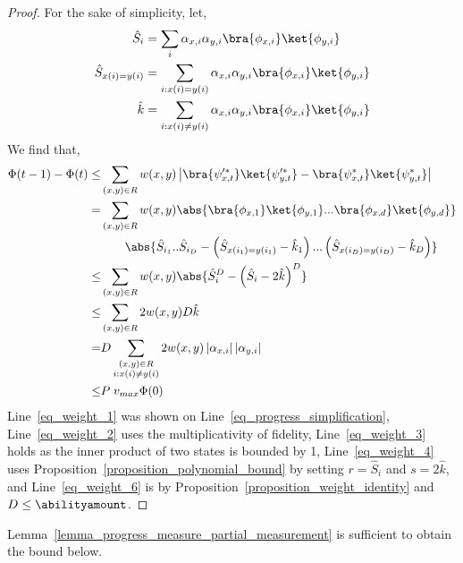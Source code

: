 \begin{proof}
    For the sake of simplicity, let,
    \begin{align*}
        \hat{S}_i &= \sum_{i} \alpha_{x,i}\alpha_{y,i}\bra{\phi_{x,i}}\ket{\phi_{y,i}}\\
        \hat{S}_{x(i)=y(i)} &= \sum_{i:x(i)=y(i) } \alpha_{x,i}\alpha_{y,i}\bra{\phi_{x,i}}\ket{\phi_{y,i}}\\
        \hat{k} &= \sum_{i: x(i)\neq y(i)}\alpha_{x,i}\alpha_{y,i}\bra{\phi_{x,i}}\ket{\phi_{y,i}}
    \end{align*}
    We find that,
    \begin{align}
        \Phi(t-1) - \Phi(t) \leq 
        &\sum_{(x,y)\in R} w(x,y) \left| \bra{\psi_{x,t}^{\prime *}}\ket{\psi_{y,t}^{\prime *}} - \bra{\psi_{x,t}^*}\ket{\psi_{y,t}^*} \right|\label{eq_weight_1}\\
        = &\sum_{(x,y)\in R} w(x,y)\abs{\bra{\phi_{x,1}}\ket{\phi_{y,1}}...\bra{\phi_{x,d}}\ket{\phi_{y,d}}} \notag\\
        &\qquad\abs{ \hat{S}_{i_1}..\hat{S}_{i_D} - \left(\hat{S}_{x(i_1)=y(i_1)} - \hat{k}_1\right)...\left(\hat{S}_{x(i_D) = y(i_D)} - \hat{k}_D\right)} \label{eq_weight_2}\\
        \leq &\sum_{(x,y)\in R} w(x,y)\abs{\hat{S}_i ^D - \left(\hat{S}_i - 2\hat{k}\right)^D } \label{eq_weight_3}\\
        \leq & \sum_{(x,y)\in R} 2 w(x,y) D \hat{k} \label{eq_weight_4}\\
        = & D \sum_{\substack{(x,y)\in R \\ i: x(i)\neq y(i)}} 2 w(x,y) \left|\alpha_{x,i} \right| \left|\alpha_{y,i}\right|\label{eq_weight_5}\\
        \leq & P\; v_{max}\Phi(0)\label{eq_weight_6}
    \end{align}
    Line~\ref{eq_weight_1} was shown on Line~\ref{eq_progress_simplification}, Line~\ref{eq_weight_2} uses the multiplicativity of fidelity, Line~\ref{eq_weight_3} holds as the inner product of two states is bounded by 1, Line~\ref{eq_weight_4} uses Proposition~\ref{proposition_polynomial_bound} by setting $r=\hat{S}_i$ and $s=2\hat{k}$, and Line~\ref{eq_weight_6} is by Proposition~\ref{proposition_weight_identity} and $D\leq \abilityamount$.
    \end{proof}

    Lemma~\ref{lemma_progress_measure_partial_measurement} is sufficient to obtain the bound below.

